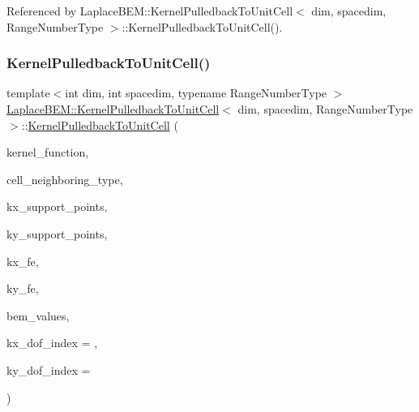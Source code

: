 Referenced by Laplace\+B\+E\+M\+::\+Kernel\+Pulledback\+To\+Unit\+Cell$<$ dim, spacedim, Range\+Number\+Type $>$\+::\+Kernel\+Pulledback\+To\+Unit\+Cell().

\mbox{\label{classLaplaceBEM_1_1KernelPulledbackToUnitCell_a3ef9d5f4401cc8d6bd7c11955fadb770}} 
\subsubsection{\texorpdfstring{Kernel\+Pulledback\+To\+Unit\+Cell()}{KernelPulledbackToUnitCell()}\hspace{0.1cm}{\footnotesize\ttfamily [2/3]}}
{\footnotesize\ttfamily template$<$int dim, int spacedim, typename Range\+Number\+Type $>$ \\
\hyperlink{classLaplaceBEM_1_1KernelPulledbackToUnitCell}{Laplace\+B\+E\+M\+::\+Kernel\+Pulledback\+To\+Unit\+Cell}$<$ dim, spacedim, Range\+Number\+Type $>$\+::\hyperlink{classLaplaceBEM_1_1KernelPulledbackToUnitCell}{Kernel\+Pulledback\+To\+Unit\+Cell} (\begin{DoxyParamCaption}\item[{const \hyperlink{classLaplaceBEM_1_1LaplaceKernel_1_1KernelFunction}{Laplace\+Kernel\+::\+Kernel\+Function}$<$ spacedim, Range\+Number\+Type $>$ \&}]{kernel\+\_\+function,  }\item[{const Cell\+Neighboring\+Type \&}]{cell\+\_\+neighboring\+\_\+type,  }\item[{const std\+::vector$<$ Point$<$ spacedim $>$$>$ \&}]{kx\+\_\+support\+\_\+points,  }\item[{const std\+::vector$<$ Point$<$ spacedim $>$$>$ \&}]{ky\+\_\+support\+\_\+points,  }\item[{const Finite\+Element$<$ dim, spacedim $>$ \&}]{kx\+\_\+fe,  }\item[{const Finite\+Element$<$ dim, spacedim $>$ \&}]{ky\+\_\+fe,  }\item[{const \hyperlink{classLaplaceBEM_1_1BEMValues}{B\+E\+M\+Values}$<$ dim, spacedim, Range\+Number\+Type $>$ $\ast$}]{bem\+\_\+values,  }\item[{const unsigned int}]{kx\+\_\+dof\+\_\+index = {},  }\item[{const unsigned int}]{ky\+\_\+dof\+\_\+index = {} }\end{DoxyParamCaption})}



